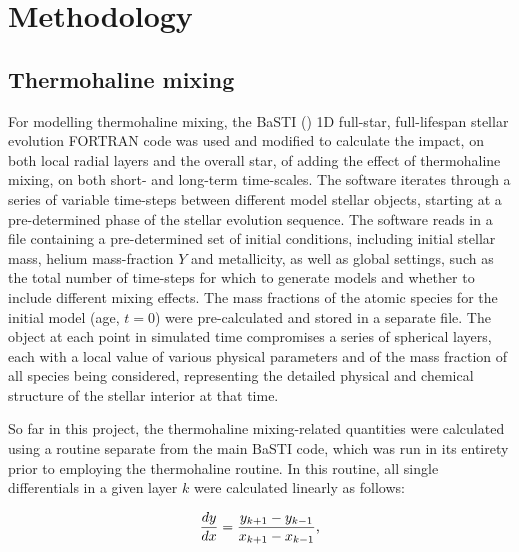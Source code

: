 \documentclass[12pt, a4paper]{report}
\begin{document}
\chapter{Methodology} \label{Methodology}
\section{Thermohaline mixing}

For modelling thermohaline mixing, the BaSTI (\cite{2004ApJ...612..168P}) 1D full-star, full-lifespan stellar evolution FORTRAN code was used and modified to calculate the impact, on both local radial layers and the overall star, of adding the effect of thermohaline mixing, on both short- and long-term time-scales. The software iterates through a series of variable time-steps between different model stellar objects, starting at a pre-determined phase of the stellar evolution sequence. The software reads in a file containing a pre-determined set of initial conditions, including initial stellar mass, helium mass-fraction $Y$ and metallicity, as well as global settings, such as the total number of time-steps for which to generate models and whether to include different mixing effects. The mass fractions of the atomic species for the initial model (age, $t = 0$) were pre-calculated and stored in a separate file.
The object at each point in simulated time compromises a series of spherical layers, each with a local value of various physical parameters and of the mass fraction of all species being considered, representing the detailed physical and chemical structure of the stellar interior at that time.

So far in this project, the thermohaline mixing-related quantities were calculated using a routine separate from the main BaSTI code, which was run in its entirety prior to employing the thermohaline routine. In this routine, all single differentials in a given layer $k$ were calculated linearly as follows:

\begin{equation}
\frac{dy}{dx} = \frac{y_{k+1} - y_{k-1}}{x_{k+1} - x_{k-1}} \textnormal{,}
\label{dy/dx_iter}
\end{equation}
\end{document}

